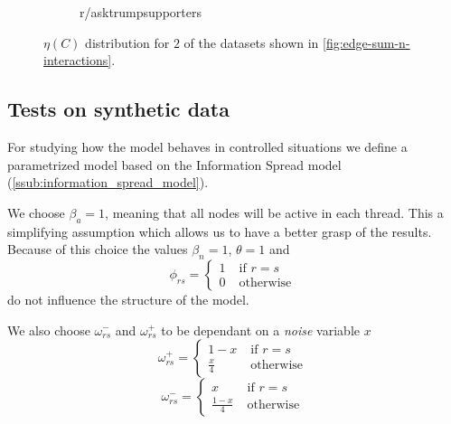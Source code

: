 \begin{figure}
\begin{center}
\begin{subfigure}[b]{0.4\textwidth}
			\caption{r/asktrumpsupporters}
			\label{fig:asktrump-hist-eta}
		\end{subfigure}
	\end{center}
	\caption{$\eta(C)$ distribution for $2$ of the datasets shown in
		\autoref{fig:edge-sum-n-interactions}.}
	\label{fig:eta-distribution-content}
\end{figure}

%


\subsection{Tests on synthetic data}%
\label{sub:testing_on_synthetic_data}

For studying how the model behaves in controlled situations we define a
parametrized model based on the Information Spread model
(\autoref{ssub:information_spread_model}).

We choose $\beta _{a} = 1$, meaning that all nodes will be active in each
thread. This a
simplifying assumption which allows us to have a better grasp of the results.
Because of this choice the values $\beta _n = 1$, $\theta = 1$ and
\begin{equation}
	\phi_{rs}  =
	\begin{cases}
		1 \; & \text{if } r = s  \\
		0 \; & \text{otherwise }
	\end{cases}
\end{equation}
do not influence the structure of the model.

We also choose $\omega ^{-} _{rs}$ and $\omega ^{+} _{rs} $ to be dependant on
a \emph{noise} variable $x$
\begin{equation}
	\omega_{rs}^{+}   =
	\begin{cases}
		1 - x \;        & \text{if } r = s  \\
		\frac{x}{4}  \; & \text{otherwise }
	\end{cases}
\end{equation}
\begin{equation}
	\omega_{rs}^{-}   =
	\begin{cases}
		x \;                & \text{if } r = s  \\
		\frac{1 - x}{4}  \; & \text{otherwise }
	\end{cases}
\end{equation}

